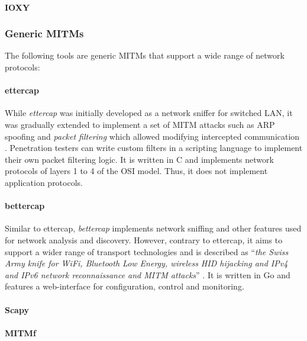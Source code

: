 \paragraph{IOXY}
\subsubsection{Generic \acp{MITM}}
The following tools are generic \acp{MITM} that support a wide range of network protocols:
\paragraph{ettercap} While \emph{ettercap} was initially developed as a network sniffer for switched \ac{LAN}, it was gradually extended to implement a set of \ac{MITM} attacks such as \ac{ARP} spoofing and \emph{packet filtering} which allowed modifying intercepted communication \cite{ettercap}. Penetration testers can write custom filters in a scripting language to implement their own packet filtering logic. It is written in C and implements network protocols of layers 1 to 4 of the \ac{OSI} model. Thus, it does not implement application protocols.
\paragraph{bettercap} Similar to ettercap, \emph{bettercap} implements network sniffing and other features used for network analysis and discovery. However, contrary to ettercap, it aims to support a wider range of transport technologies and is described as \enquote{\emph{the Swiss Army knife for WiFi, Bluetooth Low Energy, wireless HID hijacking and IPv4 and IPv6 network reconnaissance and MITM attacks}} \cite{bettercap}. It is written in Go and features a web-interface for configuration, control and monitoring.
\paragraph{Scapy}
\paragraph{MITMf} %